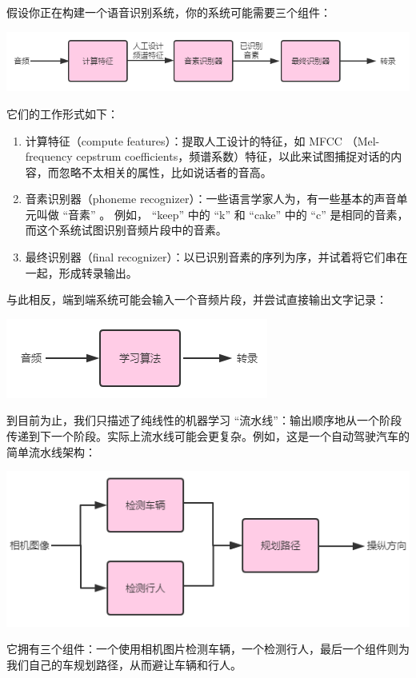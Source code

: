 假设你正在构建一个语音识别系统，你的系统可能需要三个组件：

\includegraphics{./img/ch48_01.png}

它们的工作形式如下：

\begin{enumerate}
\def\labelenumi{\arabic{enumi}.}
\tightlist
\item
  计算特征（compute features）：提取人工设计的特征，如 MFCC
  （Mel-frequency cepstrum
  coefficients，频谱系数）特征，以此来试图捕捉对话的内容，而忽略不太相关的属性，比如说话者的音高。
\item
  音素识别器（phoneme
  recognizer）：一些语言学家人为，有一些基本的声音单元叫做 ``音素'' 。
  例如， ``keep'' 中的 ``k'' 和 ``cake'' 中的 ``c''
  是相同的音素，而这个系统试图识别音频片段中的音素。
\item
  最终识别器（final
  recognizer）：以已识别音素的序列为序，并试着将它们串在一起，形成转录输出。
\end{enumerate}

与此相反，端到端系统可能会输入一个音频片段，并尝试直接输出文字记录：

\includegraphics{./img/ch48_02.png}

到目前为止，我们只描述了纯线性的机器学习
``流水线''：输出顺序地从一个阶段传递到下一个阶段。实际上流水线可能会更复杂。例如，这是一个自动驾驶汽车的简单流水线架构：

\includegraphics{./img/ch48_03.png}

它拥有三个组件：一个使用相机图片检测车辆，一个检测行人，最后一个组件则为我们自己的车规划路径，从而避让车辆和行人。

